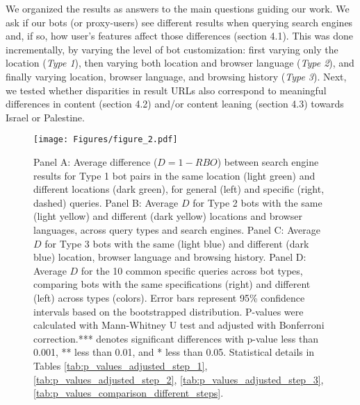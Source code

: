 We organized the results as answers to the main questions guiding our work. We ask if our bots (or proxy-users) see different results when querying search engines and, if so, how user's features affect those differences (section 4.1). This was done incrementally, by varying the level of bot customization: first varying only the location (\textit{Type 1}), then varying both location and browser language (\textit{Type 2}), and finally varying location, browser language, and browsing history (\textit{Type 3}). Next, we tested whether disparities in result URLs also correspond to meaningful differences in content (section 4.2) and/or content leaning (section 4.3) towards Israel or Palestine.

\begin{figure}[t]
    \centering
    \texttt{[image: Figures/figure\_2.pdf]}
    \caption{Panel A: Average difference ($D = 1 - RBO$) between search engine results for Type 1 bot pairs in the same location (light green) and different locations (dark green), for general (left) and specific (right, dashed) queries. Panel B: Average $D$ for Type 2 bots with the same (light yellow) and different (dark yellow) locations and browser languages, across query types and search engines. Panel C: Average $D$ for Type 3 bots with the same (light blue) and different (dark blue) location, browser language and browsing history. Panel D: Average $D$ for the 10 common specific queries across bot types, comparing bots with the same specifications (right) and different (left) across types (colors). Error bars represent 95\% confidence intervals based on the bootstrapped distribution. P-values were calculated with Mann-Whitney U test and adjusted with Bonferroni correction.*** denotes significant differences with p-value less than 0.001, ** less than 0.01, and * less than 0.05. Statistical details in Tables \ref{tab:p_values_adjusted_step_1}, \ref{tab:p_values_adjusted_step_2}, \ref{tab:p_values_adjusted_step_3}, \ref{tab:p_values_comparison_different_steps}.}
    \Description{}
    \label{fig:main_plot}
\end{figure}

